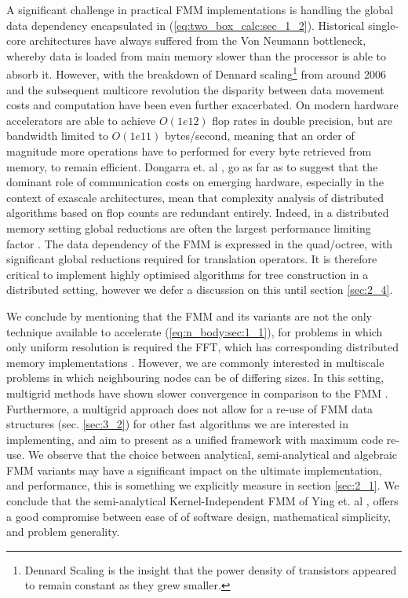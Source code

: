 A significant challenge in practical FMM implementations is handling the global data dependency encapsulated in (\ref{eq:two_box_calc:sec_1_2}). Historical single-core architectures have always suffered from the Von Neumann bottleneck, whereby data is loaded from main memory slower than the processor is able to absorb it. However, with the breakdown of Dennard scaling\footnote{Dennard Scaling is the insight that the power density of transistors appeared to remain constant as they grew smaller.} from around 2006 and the subsequent multicore revolution the disparity between data movement costs and computation have been even further exacerbated. On modern hardware accelerators are able to achieve $O(1e12)$ flop rates in double precision, but are bandwidth limited to $O(1e11)$ bytes/second, meaning that an order of magnitude more operations have to performed for every byte retrieved from memory, to remain efficient. Dongarra et. al \cite{dongarra2017extreme}, go as far as to suggest that the dominant role of communication costs on emerging hardware, especially in the context of exascale architectures, mean that complexity analysis of distributed algorithms based on flop counts are redundant entirely. Indeed, in a distributed memory setting global reductions are often the largest performance limiting factor \cite{dongarra2017extreme}. The data dependency of the FMM is expressed in the quad/octree, with significant global reductions required for translation operators. It is therefore critical to implement highly optimised algorithms for tree construction in a distributed setting, however we defer a discussion on this until section \ref{sec:2_4}.

We conclude by mentioning that the FMM and its variants are not the only technique available to accelerate (\ref{eq:n_body:sec:1_1}), for problems in which only uniform resolution is required the FFT, which has corresponding distributed memory implementations \cite{gholami2015accfft}. However, we are commonly interested in multiscale problems in which neighbouring nodes can be of differing sizes. In this setting, multigrid methods have shown slower convergence in comparison to the FMM \cite{yokota2015fast,gholami2016fft}. Furthermore, a multigrid approach does not allow for a re-use of FMM data structures (sec. \ref{sec:3_2}) for other fast algorithms we are interested in implementing, and aim to present as a unified framework with maximum code re-use. We observe that the choice between analytical, semi-analytical and algebraic FMM variants may have a significant impact on the ultimate implementation, and performance, this is something we explicitly measure in section \ref{sec:2_1}. We conclude that the semi-analytical Kernel-Independent FMM of Ying et. al \cite{Ying:2004:JCP}, offers a good compromise between ease of of software design, mathematical simplicity, and problem generality.

